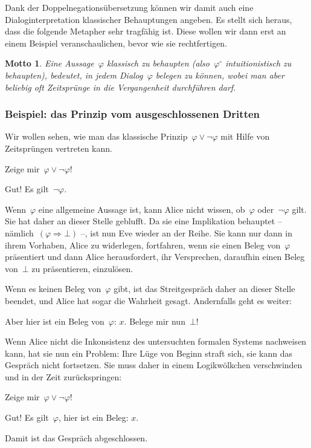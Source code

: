\documentclass[a4paper,ngerman,12pt]{scrartcl}
\theoremstyle{definition}
\theoremstyle{plain}
\newtheorem{motto}[defn]{Motto}
\theoremstyle{remark}
\renewcommand{\_}{\mathpunct{.}\,}
\newcommand{\?}{\,{:}\,}
\newcommand{\Alice}{\item[Alice]}
\newcommand{\Eve}{\item[Eve]}
\newenvironment{dialogue}[1]{%
  \begin{list}{}{%
    \settowidth{\labelwidth}{\qquad\emph{#1:}}
    \setlength{\labelsep}{0.3cm}
    \setlength{\leftmargin}{\labelwidth}
    \addtolength{\leftmargin}{\labelsep}
    \setlength{\rightmargin}{0pt}
    \setlength{\parsep}{0.5ex plus 0.2ex minus 0.1ex}
    \setlength{\itemsep}{0 ex plus 0.2ex}
    \renewcommand{\makelabel}[1]{\qquad\emph{##1:}\hfil}
    }
}{\end{list}}
\begin{document}
Dank der Doppelnegationsübersetzung können wir damit auch eine
Dialoginterpretation klassischer Behauptungen angeben. Es stellt sich heraus,
dass die folgende Metapher sehr tragfähig ist. Diese wollen wir dann erst an
einem Beispiel veranschaulichen, bevor wie sie rechtfertigen.

\begin{motto}
Eine Aussage~$\varphi$ klassisch zu behaupten (also~$\varphi^\circ$
intuitionistisch zu behaupten), bedeutet, in jedem Dialog~$\varphi$ belegen zu
können, wobei man aber beliebig oft Zeitsprünge in die Vergangenheit
durchführen darf.
\end{motto}


\subsubsection*{Beispiel: das Prinzip vom ausgeschlossenen Dritten}

Wir wollen sehen, wie man das klassische Prinzip~$\varphi \vee
\neg\varphi$ mit Hilfe von Zeitsprüngen vertreten kann.
\begin{dialogue}{Alice}
\Eve Zeige mir~$\varphi \vee \neg\varphi$!
\Alice Gut! Es gilt~$\neg\varphi$.
\end{dialogue}
Wenn~$\varphi$ eine allgemeine Aussage ist, kann Alice nicht wissen,
ob~$\varphi$ oder~$\neg\varphi$ gilt. Sie hat daher an dieser Stelle geblufft.
Da sie eine Implikation behauptet -- nämlich~$(\varphi \Rightarrow \bot)$ --, ist nun Eve
wieder an der Reihe. Sie kann nur dann in ihrem Vorhaben, Alice zu widerlegen,
fortfahren, wenn sie einen Beleg von~$\varphi$ präsentiert und dann Alice
herausfordert, ihr Versprechen, daraufhin einen Beleg von~$\bot$ zu
präsentieren, einzulösen.

Wenn es keinen Beleg von~$\varphi$ gibt, ist das Streitgespräch daher an dieser
Stelle beendet, und Alice hat sogar die Wahrheit gesagt. Andernfalls geht es
weiter:
\begin{dialogue}{Alice}
\Eve Aber hier ist ein Beleg von~$\varphi$: $x$. Belege mir nun~$\bot$!
\end{dialogue}
Wenn Alice nicht die Inkonsistenz des untersuchten formalen Systems nachweisen
kann, hat sie nun ein Problem: Ihre Lüge von Beginn straft sich, sie kann das
Gespräch nicht fortsetzen. Sie muss daher in einem Logikwölkchen verschwinden
und in der Zeit zurückspringen:
\begin{dialogue}{Alice}
\Eve Zeige mir~$\varphi \vee \neg\varphi$!
\Alice Gut! Es gilt~$\varphi$, hier ist ein Beleg: $x$.
\end{dialogue}
Damit ist das Gespräch abgeschlossen.
\end{document}
